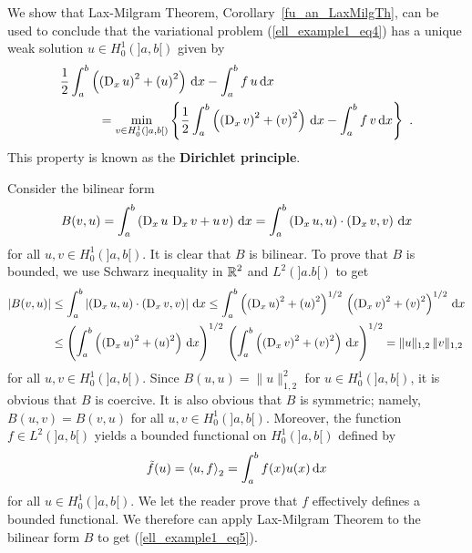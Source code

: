 \begin{egg}
We show that Lax-Milgram Theorem, Corollary~\ref{fu_an_LaxMilgTh}, can
be used to conclude that the variational problem
(\ref{ell_example1_eq4}) has a unique weak solution
$\displaystyle u \in H^1_0(]a,b[)$ given by
\begin{equation} \label{ell_example1_eq5}
\begin{split}
&\frac{1}{2} \int_a^b \left( \left(\operatorname{D}_x u\right)^2 +
\left(u\right)^2\right) \,\mathrm{d}{x} - \int_a^b f\, u \,\mathrm{d}{x}\\
&\qquad \quad = \min_{v \in H^1_0(]a,b[)} \left\{
\frac{1}{2} \int_a^b \left( \left(\operatorname{D}_x v\right)^2 +
\left(v\right)^2\right) \,\mathrm{d}{x} - \int_a^b f\, v \,\mathrm{d}{x} \right\} \ .
\end{split}
\end{equation}
This property is known as the {\bfseries Dirichlet principle}.

Consider the bilinear form
\[
B(v,u) = \int_a^b \left( \operatorname{D}_x u\, \operatorname{D}_x v + u \, v \right) \,\mathrm{d}{x}
= \int_a^b \left( \operatorname{D}_x u, u\right)\cdot\left(\operatorname{D}_x v,v \right) \,\mathrm{d}{x}
\]
for all $\displaystyle u,v \in H^1_0(]a,b[)$.
It is clear that $B$ is bilinear.  To prove that $B$ is
bounded, we use Schwarz inequality in $\displaystyle \mathbb{R}^2$ and
$\displaystyle L^2(]a.b[)$ to get
\begin{align*}
|B(v,u)| &\leq \int_a^b \left| \left( \operatorname{D}_x u, u\right) \cdot
\left(\operatorname{D}_x v, v \right) \right| \,\mathrm{d}{x}
\leq \int_a^b \left(\left( \operatorname{D}_x u\right)^2
+\left(u\right)^2\right)^{1/2} \, \left(\left( \operatorname{D}_x v\right)^2
+\left(v\right)^2\right)^{1/2} \,\mathrm{d}{x} \\
&\leq \left( \int_a^b \left(\left( \operatorname{D}_x u\right)^2
+\left(u\right)^2\right) \,\mathrm{d}{x} \right)^{1/2} \,
\left( \int_a^b \left(\left(\operatorname{D}_x v\right)^2
+\left(v\right)^2\right) \,\mathrm{d}{x} \right)^{1/2}
= \| u\|_{1,2} \, \|v\|_{1,2}
\end{align*}
for all $\displaystyle u,v \in H^1_0(]a,b[)$.
Since $\displaystyle B(u,u) = \|u\|_{1,2}^2$ for
$\displaystyle u\in H^1_0(]a,b[)$, it is obvious
that $B$ is coercive.  It is also obvious that $B$ is
symmetric; namely, $B(u,v)=B(v,u)$ for all $\displaystyle u,v \in H^1_0(]a,b[)$.
Moreover, the function $\displaystyle f \in L^2(]a,b[)$ yields a
bounded functional on $\displaystyle H^1_0(]a,b[)$ defined by
\[
\tilde{f}(u) = \left\langle{u} , {f}\right\rangle_2 = \int_a^b f(x)u(x)\,\mathrm{d}{x}
\]
for all $\displaystyle u \in H^1_0(]a,b[)$.
We let the reader prove that $f$ effectively defines a bounded
functional.  We therefore can apply Lax-Milgram Theorem to the
bilinear form $B$ to get (\ref{ell_example1_eq5}).


\end{egg}

